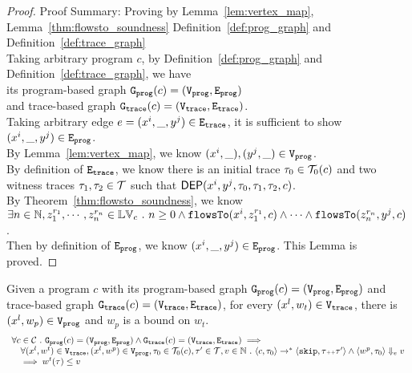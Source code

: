 \begin{proof}
Proof Summary: Proving by Lemma~\ref{lem:vertex_map}, Lemma~\ref{thm:flowsto_soundness} Definition~\ref{def:prog_graph} and Definition~\ref{def:trace_graph}
\\
Taking arbitrary program $c$,
by Definition~\ref{def:prog_graph} and Definition~\ref{def:trace_graph}, 
we have   
\\
its program-based graph $\mathtt{{G_{prog}}}({c}) = (\mathtt{{V_{prog}}}, \mathtt{{E_{prog}}})$ 
\\
and 
trace-based graph $\mathtt{{G_{trace}}}({c}) = (\mathtt{{V_{trace}}}, \mathtt{{E_{trace}}})$.
\\
Taking arbitrary edge $e = (x^i, \_, y^j) \in \mathtt{{E_{trace}}}$, it is sufficient to show $(x^i,  \_, y^j) \in \mathtt{{E_{prog}}}$.
\\
By Lemma~\ref{lem:vertex_map}, we know $(x^i, \_), (y^j, \_) \in \mathtt{{V_{prog}}}$.
\\
By definition of $\mathtt{{E_{trace}}}$, we know there is an initial trace $\mathtt{\tau}_0 \in \mathcal{T}_0(c)$ and 
two witness traces $\mathtt{\tau}_1, \mathtt{\tau}_2 \in \mathcal{T}$
such that $\mathsf{DEP}(x^i, y^j, \mathtt{\tau}_0, \mathtt{\tau}_1, \mathtt{\tau}_2, c)$.
\\
By Theorem~\ref{thm:flowsto_soundness}, we know $ \exists n \in \mathbb{N}, z_1^{r_1}, \cdots, z_n^{r_n} \in \mathbb{LV}_{{c}} ~.~  
n \geq 0 \land
\mathtt{flowsTo}(x^i,  z_1^{r_1}, c) 
\land \cdots \land \mathtt{flowsTo}(z_n^{r_n}, y^j, c) $.
\\
Then by definition of $\mathtt{{E_{prog}}}$, we know $(x^i, \_, y^j) \in \mathtt{{E_{prog}}}$. This Lemma is proved.
\end{proof}
%
\begin{lem}
	\label{lem:vertexweights_map}
	Given a program $c$ with its
	program-based graph $\mathtt{{G_{prog}}}({c}) = (\mathtt{{V_{prog}}}, \mathtt{{E_{prog}}})$
	and 
	trace-based graph $\mathtt{{G_{trace}}}({c}) = (\mathtt{{V_{trace}}}, \mathtt{{E_{trace}}})$,
	for every $(x^l, w_{t}) \in \mathtt{{V_{trace}}}$, there is $(x^l, w_{p}) \in \mathtt{{V_{prog}}}$ and 
	$w_{p}$ is a bound on $w_t$.
	\[
		\begin{array}{l}
			\forall c \in \mathcal{C} 
			 ~.~  
			 \mathtt{{G_{prog}}}({c}) = (\mathtt{{V_{prog}}}, \mathtt{{E_{prog}}})
			\land 
			\mathtt{{G_{trace}}}({c}) = (\mathtt{{V_{trace}}}, \mathtt{{E_{trace}}})
			\implies
			\\ \quad
			\forall (x^l, w^{t}) \in \mathtt{{V_{trace}}},
			(x^l, w^{p}) \in \mathtt{{V_{prog}}}, 
			\mathtt{\tau}_0 \in \mathcal{T}_0(c), 
			\mathtt{\tau}' \in \mathcal{T}, v \in \mathbb{N} ~.~ 
			\langle {c}, \mathtt{\tau}_0 \rangle \to^{*} \langle \mathtt{skip}, \mathtt{\tau}{\scriptscriptstyle ++}\mathtt{\tau}' \rangle 
			\land 
			\langle w^{p}, \mathtt{\tau}_0 \rangle \Downarrow_e v
			\\ \quad
			\implies
			w^{t}(\mathtt{\tau}) \leq v
		\end{array}
		\]
	\end{lem}
